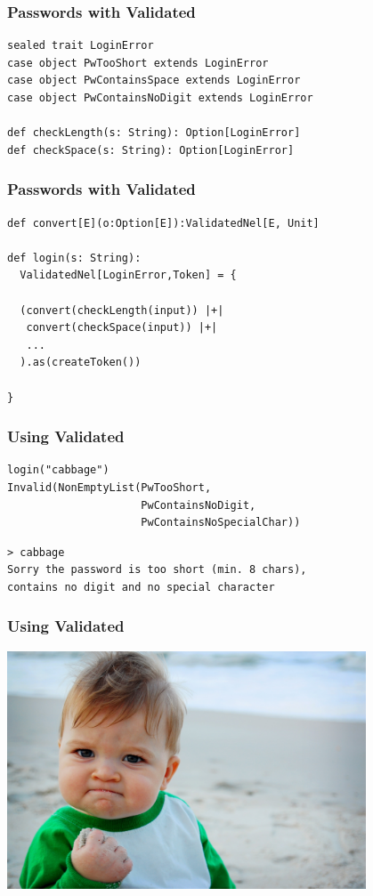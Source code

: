 \documentclass{beamer}
\begin{document}
\begin{frame}[fragile]
  \frametitle{Passwords with Validated}
\begin{verbatim}
sealed trait LoginError
case object PwTooShort extends LoginError
case object PwContainsSpace extends LoginError
case object PwContainsNoDigit extends LoginError

def checkLength(s: String): Option[LoginError]
def checkSpace(s: String): Option[LoginError]
\end{verbatim}
\end{frame}

\begin{frame}[fragile]
  \frametitle{Passwords with Validated}
\begin{verbatim}
def convert[E](o:Option[E]):ValidatedNel[E, Unit]

def login(s: String):
  ValidatedNel[LoginError,Token] = {

  (convert(checkLength(input)) |+|
   convert(checkSpace(input)) |+|
   ...
  ).as(createToken())

}
\end{verbatim}
\end{frame}

\begin{frame}
  \frametitle{Using Validated}
\begin{verbatim}
login("cabbage")
Invalid(NonEmptyList(PwTooShort,
                     PwContainsNoDigit,
                     PwContainsNoSpecialChar))
\end{verbatim}
\begin{verbatim}
> cabbage
Sorry the password is too short (min. 8 chars),
contains no digit and no special character
\end{verbatim}
\end{frame}

\begin{frame}
  \frametitle{Using Validated}
  \begin{center}
    \includegraphics[width=0.8\textwidth]{../images/double-success.jpg}
  \end{center}
\end{frame}
\end{document}
